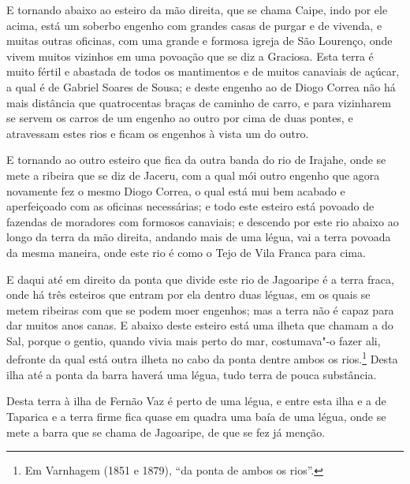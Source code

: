 E tornando abaixo ao esteiro da mão direita, que se chama Caipe, indo por ele acima, está
um soberbo engenho com grandes casas de purgar e de vivenda, e muitas outras oficinas, com
uma grande e formosa igreja de São Lourenço, onde vivem muitos vizinhos em uma povoação
que se diz a Graciosa. Esta terra é muito fértil e abastada de todos os mantimentos e de
muitos canaviais de açúcar, a qual é de Gabriel Soares de Sousa; e deste engenho ao de
Diogo Correa não há mais distância que quatrocentas braças de caminho de carro, e para
vizinharem se servem os carros de um engenho ao outro por cima de duas pontes, e
atravessam estes rios e ficam os engenhos à vista um do outro.

E tornando ao outro esteiro que fica da outra banda do rio de Irajahe, onde se mete a
ribeira que se diz de Jaceru, com a qual mói outro engenho que agora novamente fez o mesmo
Diogo Correa, o qual está mui bem acabado e aperfeiçoado com as oficinas necessárias; e
todo este esteiro está povoado de fazendas de moradores com formosos canaviais; e descendo
por este rio abaixo ao longo da terra da mão direita, andando mais de uma légua, vai a
terra povoada da mesma maneira, onde este rio é como o Tejo de Vila Franca para cima.

E daqui até em direito da ponta que divide este rio de Jagoaripe é a terra fraca, onde há
três esteiros que entram por ela dentro duas léguas, em os quais se metem ribeiras com que
se podem moer engenhos; mas a terra não é capaz para dar muitos anos canas. E abaixo deste
esteiro está uma ilheta que chamam a do Sal, porque o gentio, quando vivia mais perto do
mar, costumava"-o fazer ali, defronte da qual está outra ilheta no cabo da ponta dentre
ambos os rios.\footnote{ Em Varnhagem (1851 e 1879), ``da ponta de ambos os rios''.}
Desta ilha até a ponta da barra haverá uma légua, tudo terra de pouca substância.

Desta terra à ilha de Fernão Vaz é perto de uma légua, e entre esta ilha e a de Taparica e
a terra firme fica quase em quadra uma baía de uma légua, onde se mete a barra que se
chama de Jagoaripe, de que se fez já menção.

